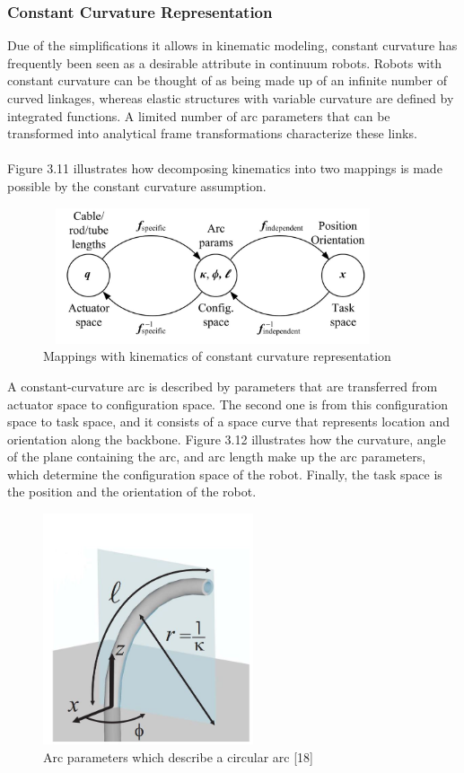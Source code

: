 \documentclass[12pt,twoside,a4]{mwbk}
\begin{document}
\subsubsection{Constant Curvature Representation}
Due of the simplifications it allows in kinematic modeling, constant curvature has frequently been seen as a desirable attribute in continuum robots. Robots with constant curvature can be thought of as being made up of an infinite number of curved linkages, whereas elastic structures with variable curvature are defined by integrated functions. A limited number of arc parameters that can be transformed into analytical frame transformations characterize these links.
\\ \\ 
Figure 3.11 illustrates how decomposing kinematics into two mappings is made possible by the constant curvature assumption. 
\newpage
\begin{figure}[h]
    \centering
    \includegraphics[width=10.0cm, height=4.0cm]{map.JPG}
    \caption{Mappings with kinematics of constant curvature representation}
\end{figure}

\noindent A constant-curvature arc is described by parameters that are transferred from actuator space to configuration space. The second one is from this configuration space to task space, and it consists of a space curve that represents location and orientation along the backbone. Figure 3.12 illustrates how the curvature, angle of the plane containing the arc, and arc length make up the arc parameters, which determine the configuration space of the robot. Finally, the task space is the position and the orientation of the robot.
\begin{figure}[h]
    \centering
    \includegraphics[width=6.2cm, height=6.8cm]{arc.JPG}
    \caption{Arc parameters which describe a circular arc [18]}
\end{figure}
\end{document}
